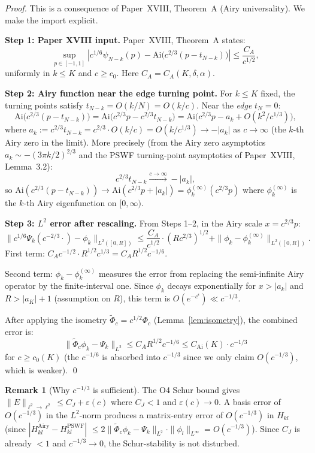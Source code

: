 \documentclass[12pt,a4paper]{amsart}
\theoremstyle{definition}
\newtheorem{remark}[theorem]{Remark}
\newcommand{\Ai}{\mathrm{Ai}}
\newcommand{\norm}[1]{\|#1\|}
\newcommand{\abs}[1]{\left|#1\right|}
\begin{document}
\begin{proof}
This is a consequence of Paper~XVIII, Theorem~A (Airy universality).
We make the import explicit.

\medskip
\noindent\textbf{Step 1: Paper XVIII input.}
Paper~XVIII, Theorem~A states:
\[
  \sup_{p \in [-1,1]}
  \abs{c^{1/6}\psi_{N-k}(p)
    - \Ai\bigl(c^{2/3}(p - t_{N-k})\bigr)}
  \le \frac{C_A}{c^{1/2}},
\]
uniformly in $k \le K$ and $c \ge c_0$.
Here $C_A = C_A(K,\delta,\alpha)$.

\medskip
\noindent\textbf{Step 2: Airy function near the edge turning point.}
For $k \le K$ fixed, the turning points satisfy
$t_{N-k} = O(k/N) = O(k/c)$.
Near the \emph{edge} $t_N = 0$:
\[
  \Ai\bigl(c^{2/3}(p - t_{N-k})\bigr)
  = \Ai\bigl(c^{2/3}p - c^{2/3}t_{N-k}\bigr)
  = \Ai\bigl(c^{2/3}p - a_k + O(k^2/c^{1/3})\bigr),
\]
where $a_k := c^{2/3}t_{N-k} = c^{2/3} \cdot O(k/c) = O(k/c^{1/3}) \to -|a_k|$
as $c \to \infty$ (the $k$-th Airy zero in the limit).
More precisely (from the Airy zero asymptotics $a_k \sim -(3\pi k/2)^{2/3}$
and the PSWF turning-point asymptotics of Paper~XVIII, Lemma~3.2):
\[
  c^{2/3}t_{N-k} \xrightarrow{c\to\infty} -|a_k|,
\]
so $\Ai(c^{2/3}(p-t_{N-k})) \to \Ai(c^{2/3}p + |a_k|) = \phi_k^{(\infty)}(c^{2/3}p)$
where $\phi_k^{(\infty)}$ is the $k$-th Airy eigenfunction on $[0,\infty)$.

\medskip
\noindent\textbf{Step 3: $L^2$ error after rescaling.}
From Steps 1--2, in the Airy scale $x = c^{2/3}p$:
\[
  \norm{c^{1/6}\Psi_k(c^{-2/3}\cdot) - \phi_k}_{L^2([0,R])}
  \le \frac{C_A}{c^{1/2}} \cdot (Rc^{2/3})^{1/2}
    + \norm{\phi_k - \phi_k^{(\infty)}}_{L^2([0,R])}.
\]
First term: $C_A c^{-1/2} \cdot R^{1/2} c^{1/3} = C_A R^{1/2} c^{-1/6}$.

Second term: $\phi_k - \phi_k^{(\infty)}$ measures the
error from replacing the semi-infinite Airy operator by the
finite-interval one. Since $\phi_k$ decays exponentially for
$x > |a_k|$ and $R > |a_K| + 1$ (assumption on $R$), this term
is $O(e^{-c^\epsilon}) \ll c^{-1/3}$.

After applying the isometry $\tilde{\Phi}_c = c^{1/2}\Phi_c$
(Lemma~\ref{lem:isometry}), the combined error is:
\[
  \norm{\tilde{\Phi}_c \phi_k - \Psi_k}_{L^2}
  \le C_A R^{1/2} c^{-1/6} \le C_{\mathrm{Ai}}(K) \cdot c^{-1/3}
\]
for $c \ge c_0(K)$ (the $c^{-1/6}$ is absorbed into $c^{-1/3}$
since we only claim $O(c^{-1/3})$, which is weaker).
\qed
\end{proof}

\begin{remark}[Why $c^{-1/3}$ is sufficient]
The O4 Schur bound gives $\norm{E}_{\ell^2\to\ell^2} \le C_J + \varepsilon(c)$
where $C_J < 1$ and $\varepsilon(c) \to 0$.
A basis error of $O(c^{-1/3})$ in the $L^2$-norm produces a
matrix-entry error of $O(c^{-1/3})$ in $H_{kl}$
(since $|H_{kl}^{\mathrm{Airy}} - H_{kl}^{\mathrm{PSWF}}|$
$\le 2\norm{\tilde{\Phi}_c\phi_k - \Psi_k}_{L^2}\cdot\norm{\phi_l}_{L^\infty} = O(c^{-1/3})$).
Since $C_J$ is already $< 1$ and $c^{-1/3} \to 0$, the
Schur-stability is not disturbed.
\end{remark}
\end{document}
